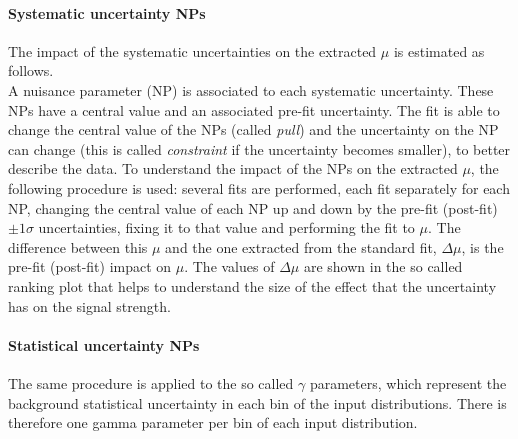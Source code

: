 \paragraph{Systematic uncertainty NPs} The impact of the systematic
uncertainties on the extracted $\mu$ is estimated as follows. \\
A nuisance parameter (NP) is associated to each systematic uncertainty.
These NPs have a central value and an associated pre-fit uncertainty.
The fit is able to change the central value of the NPs (called \textit{pull})
and the uncertainty on the NP can change (this is called \textit{constraint}
if the uncertainty becomes smaller), to better describe the data.
To understand the impact of the NPs on the extracted $\mu$, the
following procedure is used:
several fits are performed, each fit separately for each NP,
changing the central value of each NP up and down by the pre-fit
(post-fit) $\pm 1 \sigma$ uncertainties,
fixing it to that value and performing the fit to $\mu$.
The difference between this $\mu$ and the one extracted from the
standard fit, $\Delta\mu$, is the pre-fit (post-fit) impact on $\mu$.
The values of $\Delta\mu$ are shown in the so called ranking plot that 
helps to understand the size of the effect that
the uncertainty has on the signal strength. \\

\paragraph{Statistical uncertainty NPs} The same procedure is applied
to the so called $\gamma$ parameters, which represent the background
statistical uncertainty in each bin of the input distributions.
There is therefore one gamma parameter per bin of each input distribution. 

